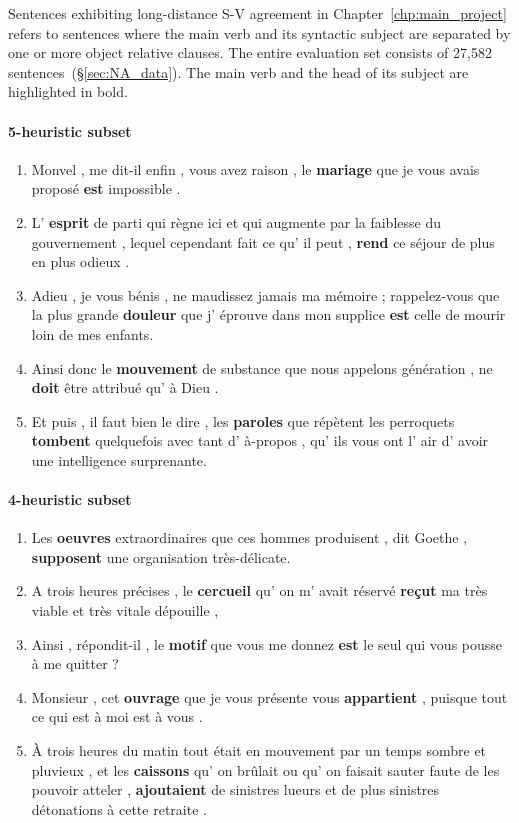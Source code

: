 Sentences exhibiting long-distance S-V agreement in Chapter~\ref{chp:main_project} refers to sentences where the main verb and its syntactic subject are separated by one or more object relative clauses. The entire evaluation set consists of 27,582 sentences~(\S\ref{sec:NA_data}). The main verb and the head of its subject are highlighted in bold.  
\paragraph{5-heuristic subset}
\begin{enumerate}[itemsep=0pt,label=\arabic*).]
    \item Monvel , me dit-il enfin , vous avez raison , le \textbf{mariage} que je vous avais proposé \textbf{est} impossible .
    \item L' \textbf{esprit} de parti qui règne ici et qui augmente par la faiblesse du gouvernement , lequel cependant fait ce qu' il peut , \textbf{rend} ce séjour de plus en plus odieux .
    \item Adieu , je vous bénis , ne maudissez jamais ma mémoire ; rappelez-vous que la plus grande \textbf{douleur} que j' éprouve dans mon supplice \textbf{est} celle de mourir loin de mes enfants.
    \item Ainsi donc le \textbf{mouvement} de substance que nous appelons génération , ne \textbf{doit} être attribué qu' à Dieu .
    \item Et puis , il faut bien le dire , les \textbf{paroles} que répètent les perroquets \textbf{tombent} quelquefois avec tant d' à-propos , qu' ils vous ont l' air d' avoir une intelligence surprenante.
\end{enumerate}

\paragraph{4-heuristic subset}
\begin{enumerate}[itemsep=0pt,label=\arabic*).]
    \item Les \textbf{oeuvres} extraordinaires que ces hommes produisent , dit Goethe , \textbf{supposent} une organisation très-délicate.
    \item A trois heures précises , le \textbf{cercueil} qu' on m' avait réservé \textbf{reçut} ma très viable et très vitale dépouille ,
    \item Ainsi , répondit-il , le \textbf{motif} que vous me donnez \textbf{est} le seul qui vous pousse à me quitter ?
    \item Monsieur , cet \textbf{ouvrage} que je vous présente vous \textbf{appartient} , puisque tout ce qui est à moi est à vous .
    \item À trois heures du matin tout était en mouvement par un temps sombre et pluvieux , et les \textbf{caissons} qu' on brûlait ou qu' on faisait sauter faute de les pouvoir atteler , \textbf{ajoutaient} de sinistres lueurs et de plus sinistres détonations à cette retraite . 
\end{enumerate}

